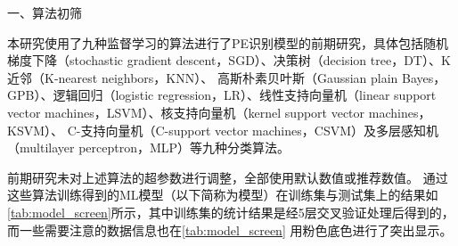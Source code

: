 一、算法初筛

本研究使用了九种监督学习的算法进行了PE识别模型的前期研究，具体包括随机梯度下降（stochastic gradient descent，SGD）、决策树（decision tree，DT）、K近邻（K-nearest neighbors，KNN）、
高斯朴素贝叶斯（Gaussian plain Bayes，GPB）、逻辑回归（logistic regression，LR）、线性支持向量机（linear support vector machines，LSVM）、核支持向量机（kernel support vector machines，KSVM）、
C-支持向量机（C-support vector machines，CSVM）及多层感知机（multilayer perceptron，MLP）等九种分类算法。

前期研究未对上述算法的超参数进行调整，全部使用默认数值或推荐数值\cite{scikit-learn}。
通过这些算法训练得到的ML模型（以下简称为模型）在训练集与测试集上的结果如\autoref{tab:model_screen}所示，其中训练集的统计结果是经5层交叉验证处理后得到的，而一些需要注意的数据信息也在\autoref{tab:model_screen}
用粉色底色进行了突出显示。
